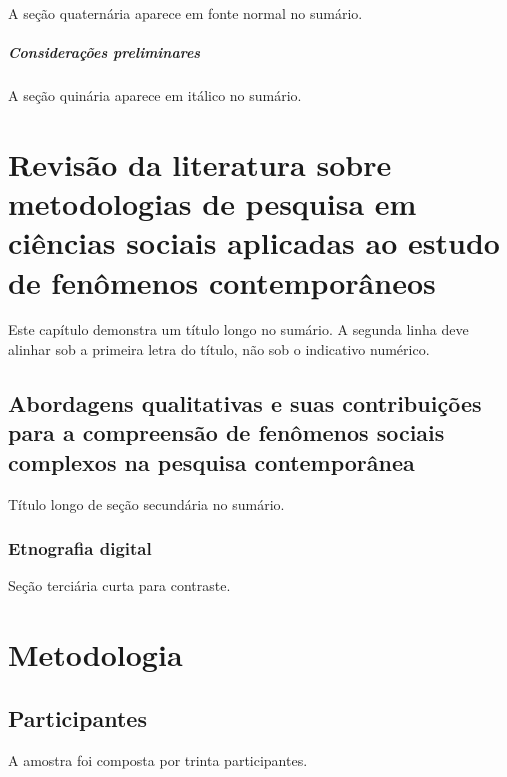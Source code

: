 \documentclass[a4paper, 12pt]{report}
\begin{document}
A seção quaternária aparece em fonte normal no sumário.

\paragraph{Considerações preliminares}

A seção quinária aparece em itálico no sumário.

\chapter{Revisão da literatura sobre metodologias de pesquisa em ciências
sociais aplicadas ao estudo de fenômenos contemporâneos}

Este capítulo demonstra um título longo no sumário. A segunda linha deve
alinhar sob a primeira letra do título, não sob o indicativo numérico.

\section{Abordagens qualitativas e suas contribuições para a compreensão de
fenômenos sociais complexos na pesquisa contemporânea}

Título longo de seção secundária no sumário.

\subsection{Etnografia digital}

Seção terciária curta para contraste.

\chapter{Metodologia}

\section{Participantes}

A amostra foi composta por trinta participantes.
\end{document}
